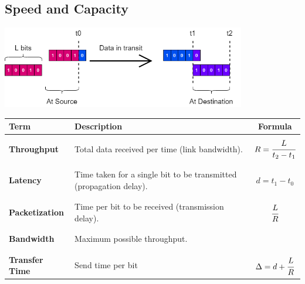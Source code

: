 \subsection{Speed and Capacity}
\begin{center}\includegraphics[width=0.8\textwidth]{basic_concepts_and_osi/images/network performance.png}\end{center}
\begin{center}
    \begin{tabular}{l l c}
        \textbf{Term}          & \textbf{Description}                                               & \textbf{Formula}            \\
        \hline
        \\
        \textbf{Throughput}    & Total data received per time (link bandwidth).                     & $R = \cfrac{L}{t_2 - t_1}$  \\
        \\
        \hline
        \\
        \textbf{Latency}       & Time taken for a single bit to be transmitted (propagation delay). & $d = t_1 - t_0$             \\
        \\
        \hline
        \\
        \textbf{Packetization} & Time per bit to be received (transmission delay).                  & $\cfrac{L}{R}$              \\
        \\
        \hline
        \\
        \textbf{Bandwidth}     & Maximum possible throughput.                                       &                             \\
        \\
        \hline
        \\
        \textbf{Transfer Time} & Send time per bit                                                  & $\Delta = d + \cfrac{L}{R}$ \\
    \end{tabular}
\end{center}

